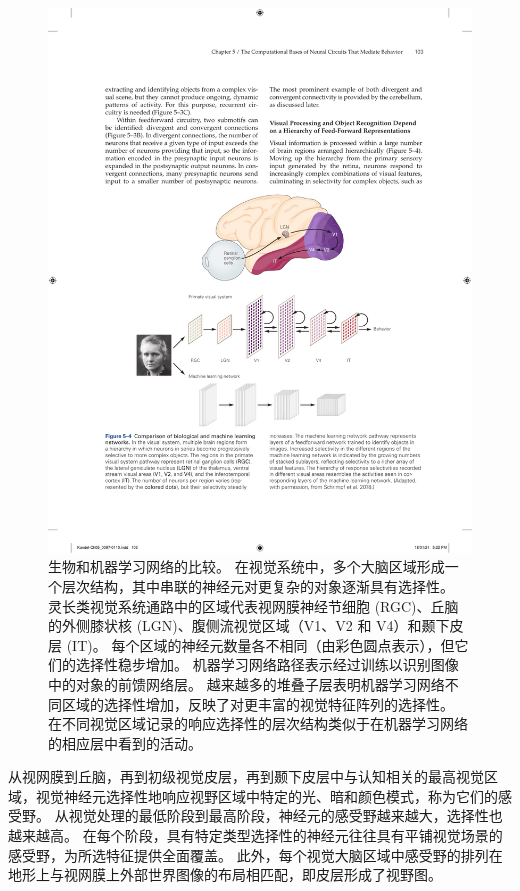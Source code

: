 \begin{figure}[htbp]
	\centering
	\includegraphics[width=1.0\linewidth]{chap05/fig_5_4}
	\caption{生物和机器学习网络的比较。 
		在视觉系统中，多个大脑区域形成一个层次结构，其中串联的神经元对更复杂的对象逐渐具有选择性。 
		灵长类视觉系统通路中的区域代表视网膜神经节细胞 (RGC)、丘脑的外侧膝状核 (LGN)、腹侧流视觉区域（V1、V2 和 V4）和颞下皮层 (IT)。
		每个区域的神经元数量各不相同（由彩色圆点表示），但它们的选择性稳步增加。 
		机器学习网络路径表示经过训练以识别图像中的对象的前馈网络层。 
		越来越多的堆叠子层表明机器学习网络不同区域的选择性增加，反映了对更丰富的视觉特征阵列的选择性。
		在不同视觉区域记录的响应选择性的层次结构类似于在机器学习网络的相应层中看到的活动\cite{schrimpf2018brain}。}
	\label{fig:5_4}
\end{figure}



从视网膜到丘脑，再到初级视觉皮层，再到颞下皮层中与认知相关的最高视觉区域，视觉神经元选择性地响应视野区域中特定的光、暗和颜色模式，称为它们的感受野。
从视觉处理的最低阶段到最高阶段，神经元的感受野越来越大，选择性也越来越高。
在每个阶段，具有特定类型选择性的神经元往往具有平铺视觉场景的感受野，为所选特征提供全面覆盖。
此外，每个视觉大脑区域中感受野的排列在地形上与视网膜上外部世界图像的布局相匹配，即皮层形成了视野图。


